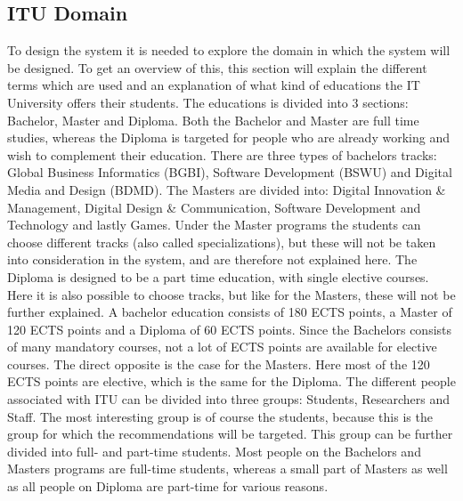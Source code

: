 \subsection{ITU Domain}
To design the system it is needed to explore the domain in which the system will be designed. To get an overview of this, this section will explain the different terms which are used and an explanation of what kind of educations the IT University offers their students.\newline
The educations is divided into 3 sections: Bachelor, Master and Diploma. Both the Bachelor and Master are full time studies, whereas the Diploma is targeted for people who are already working and wish to complement their education. There are three types of bachelors tracks: Global Business Informatics (BGBI), Software Development (BSWU) and Digital Media and Design (BDMD). The Masters are divided into: Digital Innovation \& Management, Digital Design \& Communication, Software Development and Technology and lastly Games. Under the Master programs the students can choose different tracks (also called specializations), but these will not be taken into consideration in the system, and are therefore not explained here. The Diploma is designed to be a part time education, with single elective courses. Here it is also possible to choose tracks, but like for the Masters, these will not be further explained. 
A bachelor education consists of 180 ECTS points, a Master of 120 ECTS points and a Diploma of 60 ECTS points. Since the Bachelors consists of many mandatory courses, not a lot of ECTS points are available for elective courses. The direct opposite is the case for the Masters. Here most of the 120 ECTS points are elective, which is the same for the Diploma. \newline
The different people associated with ITU can be divided into three groups: Students, Researchers and Staff. The most interesting group is of course the students, because this is the group for which the recommendations will be targeted. This group can be further divided into full- and part-time students. Most people on the Bachelors and Masters programs are full-time students, whereas a small part of Masters as well as all people on Diploma are part-time for various reasons. 
